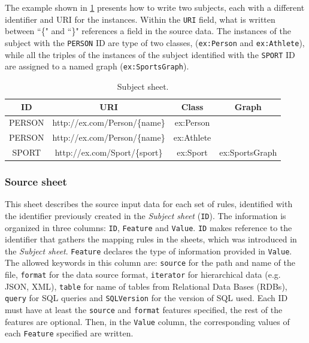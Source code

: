 The example shown in \cref{tab:subject_sheet} presents how to write two subjects, each with a different identifier and URI for the instances. Within the \texttt{URI} field, what is written between ``\{" and ``\}" references a field in the source data. The instances of the subject with the \texttt{PERSON} ID are type of two classes, (\texttt{ex:Person} and \texttt{ex:Athlete}), while all the triples of the instances of the subject identified with the \texttt{SPORT} ID are assigned to a named graph (\texttt{ex:SportsGraph}). 


\begin{table}[h!]
\caption{Subject sheet.}
\label{tab:subject_sheet}
\centering
\begin{tabular}{c|c|c|c}
\midrule
\textbf{ID} & \textbf{URI} & \textbf{Class} & \textbf{Graph} \\ \midrule
PERSON & http://ex.com/Person/\{name\} & ex:Person &  \\
PERSON & http://ex.com/Person/\{name\} & ex:Athlete &  \\
SPORT & http://ex.com/Sport/\{sport\} & ex:Sport & ex:SportsGraph \\ \midrule
\end{tabular}
\end{table}



\subsubsection{Source sheet} 

This sheet describes the source input data for each set of rules, identified with the identifier previously created in the \textit{Subject sheet} (\texttt{ID}). The information is organized in three columns: \texttt{ID}, \texttt{Feature} and \texttt{Value}. 
\texttt{ID} makes reference to the identifier that gathers the mapping rules in the sheets, which was introduced in the \textit{Subject sheet}. 
\texttt{Feature} declares the type of information provided in \texttt{Value}. The allowed keywords in this column are: \texttt{source} for the path and name of the file, \texttt{format} for the data source format, \texttt{iterator} for hierarchical data (e.g. JSON, XML), \texttt{table} for name of tables from Relational Data Bases (RDBs), \texttt{query} for SQL queries and \texttt{SQLVersion} for the version of SQL used. Each ID must have at least the \texttt{source} and \texttt{format} features specified, the rest of the features are optional. 
Then, in the \texttt{Value} column, the corresponding values of each \texttt{Feature} specified are written. 


